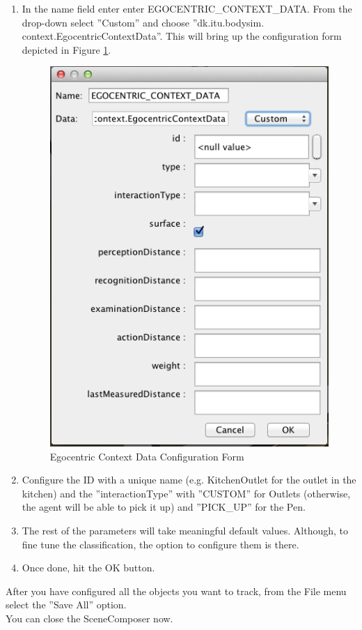 \begin{enumerate}
	\item In the name field enter enter EGOCENTRIC\_CONTEXT\_DATA. From the drop-down select ''Custom'' and choose ''dk.itu.bodysim. context.EgocentricContextData''. This will bring up the configuration form depicted in Figure \ref{fig:sd_config_form}.
		\begin{figure}[H]
			\centering
			\includegraphics[width=0.8\linewidth]{gfx/Chapter_SD_UserGuide/ssmconfig}
			\caption{Egocentric Context Data Configuration Form}
			\label{fig:sd_config_form}
		\end{figure}

	\item Configure the ID with a unique name (e.g. KitchenOutlet for the outlet in the kitchen) and the ''interactionType'' with ''CUSTOM'' for Outlets (otherwise, the agent will be able to pick it up) and ''PICK\_UP'' for the Pen.

	\item The rest of the parameters will take meaningful default values. Although, to fine tune the classification, the option to configure them is there.

	\item Once done, hit the OK button.
\end{enumerate}

After you have configured all the objects you want to track, from the File menu select the ''Save All'' option.\\

You can close the SceneComposer now.\\
